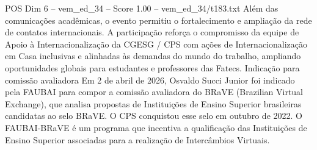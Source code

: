 \begin{textsample}{POS Dim 6 – vem\_ed\_34 – Score 1.00 – vem\_ed\_34/t183.txt}
Além das comunicações acadêmicas, o evento permitiu o fortalecimento e ampliação da rede de contatos internacionais.
A participação reforça o compromisso da equipe de Apoio à Internacionalização da CGESG / CPS com ações de Internacionalização em Casa inclusivas e alinhadas às demandas do mundo do trabalho, ampliando oportunidades globais para estudantes e professores das Fatecs.
Indicação para comissão avaliadora Em 2 de abril de 2026, Osvaldo Succi Junior foi indicado pela FAUBAI para compor a comissão avaliadora do BRaVE (Brazilian Virtual Exchange), que analisa propostas de Instituições de Ensino Superior brasileiras candidatas ao selo BRaVE.
O CPS conquistou esse selo em outubro de 2022.
O FAUBAI-BRaVE é um programa que incentiva a qualificação das Instituições de Ensino Superior associadas para a realização de Intercâmbios Virtuais.

\end{textsample}
